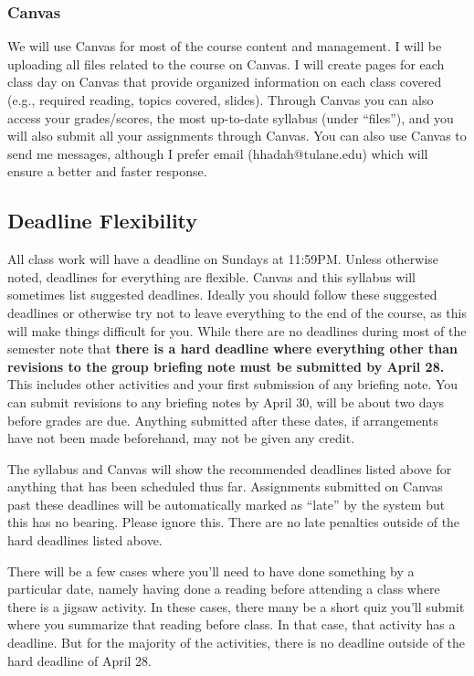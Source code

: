 \documentclass[11pt,letterpaper,final]{article}
\begin{document}
\subsubsection{Canvas}
We will use Canvas for most of the course content and management. I will be uploading all files related to the course on Canvas. I will create pages for each class day on Canvas that provide organized information on each class covered (e.g., required reading, topics covered, slides). Through Canvas you can also access your grades/scores, the most up-to-date syllabus (under ``files''), and you will also submit all your assignments through Canvas. You can also use Canvas to send me messages, although I prefer email (hhadah@tulane.edu) which will ensure a better and faster response.

 
\subsection{Deadline Flexibility}
All class work will have a deadline on Sundays at 11:59PM. Unless otherwise noted, deadlines for everything are flexible. Canvas and this syllabus will sometimes list suggested deadlines. Ideally you should follow these suggested deadlines or otherwise try not to leave everything to the end of the course, as this will make things difficult for you. While there are no deadlines during most of the semester note that \textbf{there is a hard deadline where everything other than revisions to the group briefing note must be submitted by April 28.} This includes other activities and your first submission of any briefing note. You can submit revisions to any briefing notes by April 30, will be about two days before grades are due. Anything submitted after these dates, if arrangements have not been made beforehand, may not be given any credit. 

The syllabus and Canvas will show the recommended deadlines listed above for anything that has been scheduled thus far. Assignments submitted on Canvas past these deadlines will be automatically marked as ``late'' by the system but this has no bearing. Please ignore this. There are no late penalties outside of the hard deadlines listed above.

There will be a few cases where you'll need to have done something by a particular date, namely having done a reading before attending a class where there is a jigsaw activity. In these cases, there many be a short quiz you'll submit where you summarize that reading before class. In that case, that activity has a deadline. But for the majority of the activities, there is no deadline outside of the hard deadline of April 28.
\end{document}
